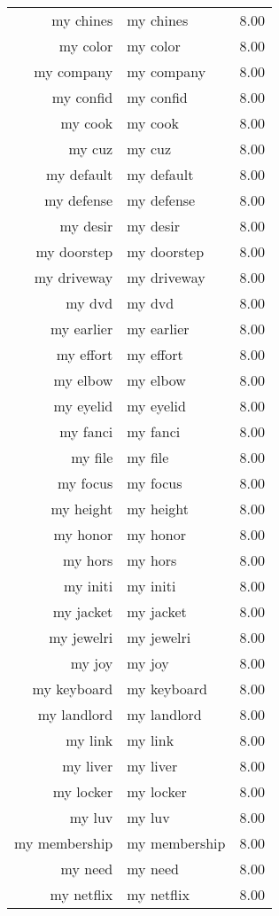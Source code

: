 \begin{table}[ht]
\begin{tabular}{rlr}
  my chines & my chines & 8.00 \\ 
  my color & my color & 8.00 \\ 
  my company & my company & 8.00 \\ 
  my confid & my confid & 8.00 \\ 
  my cook & my cook & 8.00 \\ 
  my cuz & my cuz & 8.00 \\ 
  my default & my default & 8.00 \\ 
  my defense & my defense & 8.00 \\ 
  my desir & my desir & 8.00 \\ 
  my doorstep & my doorstep & 8.00 \\ 
  my driveway & my driveway & 8.00 \\ 
  my dvd & my dvd & 8.00 \\ 
  my earlier & my earlier & 8.00 \\ 
  my effort & my effort & 8.00 \\ 
  my elbow & my elbow & 8.00 \\ 
  my eyelid & my eyelid & 8.00 \\ 
  my fanci & my fanci & 8.00 \\ 
  my file & my file & 8.00 \\ 
  my focus & my focus & 8.00 \\ 
  my height & my height & 8.00 \\ 
  my honor & my honor & 8.00 \\ 
  my hors & my hors & 8.00 \\ 
  my initi & my initi & 8.00 \\ 
  my jacket & my jacket & 8.00 \\ 
  my jewelri & my jewelri & 8.00 \\ 
  my joy & my joy & 8.00 \\ 
  my keyboard & my keyboard & 8.00 \\ 
  my landlord & my landlord & 8.00 \\ 
  my link & my link & 8.00 \\ 
  my liver & my liver & 8.00 \\ 
  my locker & my locker & 8.00 \\ 
  my luv & my luv & 8.00 \\ 
  my membership & my membership & 8.00 \\ 
  my need & my need & 8.00 \\ 
  my netflix & my netflix & 8.00 \\ 

\end{tabular}
\end{table}
